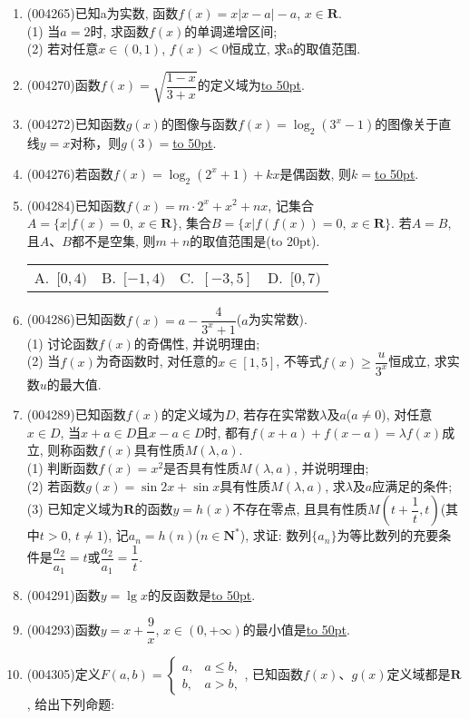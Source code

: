 \documentclass[10pt,a4paper]{article}
\newcommand{\blank}[1]{\underline{\hbox to #1pt{}}}
\newcommand{\bracket}[1]{(\hbox to #1pt{})}
\newcommand{\fourch}[4]{\par\begin{tabular}{p{.23\textwidth}p{.23\textwidth}p{.23\textwidth}p{.23\textwidth}}
A.~#1 &B.~#2& C.~#3& D.~#4
\end{tabular}}
\begin{document}
\begin{enumerate}[1.]
\item {\tiny (004265)}已知a为实数, 函数$f(x)=x|x-a|-a$, $x\in \mathbf{R}$.\\
(1) 当$a=2$时, 求函数$f(x)$的单调递增区间;\\
(2) 若对任意$x\in (0,1)$, $f(x)<0$恒成立, 求a的取值范围.
\item {\tiny (004270)}函数$f(x)=\sqrt{\dfrac{1-x}{3+x}}$的定义域为\blank{50}.
\item {\tiny (004272)}已知函数$g(x)$的图像与函数$f(x)=\log_2(3^x-1)$的图像关于直线$y=x$对称，则$g(3)=$\blank{50}.
\item {\tiny (004276)}若函数$f(x)=\log_2(2^x+1)+kx$是偶函数, 则$k=$\blank{50}.
\item {\tiny (004284)}已知函数$f(x)=m\cdot 2^x+x^2+nx$, 记集合$A=\{x|f(x)=0, \ x\in \mathbf{R}\}$, 集合$B=\{x|f(f(x))=0, \ x\in \mathbf{R}\}$.
若$A=B$, 且$A$、$B$都不是空集, 则$m+n$的取值范围是\bracket{20}.
\fourch{$[0,4)$}{$[-1,4)$}{$[-3,5]$}{$[0,7)$}
\item {\tiny (004286)}已知函数$f(x)=a-\dfrac 4{3^x+1}$($a$为实常数).\\
(1) 讨论函数$f(x)$的奇偶性, 并说明理由;\\ 
(2) 当$f(x)$为奇函数时, 对任意的$x\in [1,5]$, 不等式$f(x)\ge \dfrac u{3^x}$恒成立, 求实数$u$的最大值.
\item {\tiny (004289)}已知函数$f(x)$的定义域为$D$, 若存在实常数$\lambda$及$a$($a\ne 0$), 对任意$x\in D$, 当$x+a\in D$且$x-a\in D$时, 都有$f(x+a)+f(x-a)=\lambda f(x)$成立, 则称函数$f(x)$具有性质$M(\lambda,a)$.\\
(1) 判断函数$f(x)=x^2$是否具有性质$M(\lambda,a)$, 并说明理由;\\
(2) 若函数$g(x)=\sin 2x+\sin x$具有性质$M(\lambda,a)$, 求$\lambda$及$a$应满足的条件;\\
(3) 已知定义域为$\mathbf{R}$的函数$y=h(x)$不存在零点, 且具有性质$M(t+\dfrac{1}{t},t)$(其中$t>0$, $t\ne 1$), 记$a_n=h(n)$($n\in \mathbf{N}^*$), 求证: 数列$\{a_n\}$为等比数列的充要条件是$\dfrac{a_2}{a_1}=t$或$\dfrac{a_2}{a_1}=\dfrac{1}{t}$.
\item {\tiny (004291)}函数$y=\lg x$的反函数是\blank{50}.
\item {\tiny (004293)}函数$y=x+\dfrac 9x$, $x\in (0,+\infty)$的最小值是\blank{50}.
\item {\tiny (004305)}定义$F(a,b)=\begin{cases} a, & a \le b, \\ b, & a>b,\end{cases}$, 已知函数$f(x)$、$g(x)$定义域都是$\mathbf{R}$, 给出下列命题:\\

\end{enumerate}
\end{document}
